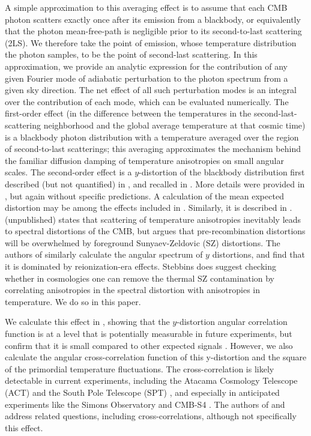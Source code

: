 \documentclass[fleqn,usenatbib]{mnras}
\begin{document}
    A simple approximation to this averaging effect is to assume that each CMB
    photon scatters exactly once after its emission from a blackbody, or
    equivalently that the photon mean-free-path is negligible prior to its
    second-to-last scattering (2LS).  We therefore take the point of emission,
    whose temperature distribution the photon samples, to be the point of
    second-last scattering.  In this approximation, we provide an analytic
    expression for the contribution of any given Fourier mode of adiabatic
    perturbation to the photon spectrum from a given sky direction.  The net
    effect of all such perturbation modes is an integral over the contribution
    of each mode, which can be evaluated numerically.  The first-order effect
    (in the difference between the temperatures in the second-last-scattering
    neighborhood and the global average temperature at that cosmic time) is a
    blackbody photon distribution with a temperature averaged over the region of
    second-to-last scatterings; this averaging approximates the mechanism behind
    the familiar diffusion damping of temperature anisotropies on small angular
    scales.  The second-order effect is a  $y$-distortion of the blackbody
    distribution first described (but not quantified) in \citep{Zeldovich+1972},
    and recalled in \citep{ChlubaSunyaev2004}.  More details were provided in
    \citep{Khatri+2012}, but again without specific predictions.  A calculation
    of the mean expected distortion may be among the effects included in
    \citep{Chluba+2012}.  Similarly, it is described in
    \citep{SunyaevKhatri2013,Chluba2016}.  \citet{Stebbins:2007ve} (unpublished)
    states that scattering of temperature anisotropies inevitably leads to
    spectral distortions of the CMB, but argues that pre-recombination
    distortions will be overwhelmed by foreground Sunyaev-Zeldovic (SZ)
    distortions.  The authors of \cite{Pitrou:2009bc} similarly calculate the
    angular spectrum of $y$ distortions, and find that it is dominated by
    reionization-era effects.  Stebbins does suggest \citep{Stebbins:2007ve}
    checking whether in \LCDM{} cosmologies one can remove the thermal SZ
    contamination by correlating anisotropies in the spectral distortion with
    anisotropies in temperature. We do so in this paper.

    We calculate this effect in \LCDM, showing that the $y$-distortion angular
    correlation function is at a level that is potentially measurable in future
    experiments, but confirm that it is small compared to other expected signals
    \citep{ChlubaSunyaev2004}.  However, we also calculate the angular
    cross-correlation function of this y-distortion and the square of the
    primordial temperature fluctuations.  The cross-correlation is likely
    detectable in current experiments, including the Atacama Cosmology Telescope
    (ACT) \citep{Coulton+2023} and the South Pole Telescope (SPT)
    \citep{SPTymap}, and especially in anticipated experiments like the Simons
    Observatory \citep{Galitzki+2018} and CMB-S4 \citep{Abitbol+2017}.  The
    authors of \citet{Chluba+2022} and \citet{Kite+2022} address related
    questions, including cross-correlations, although not specifically this
    effect.
\end{document}
